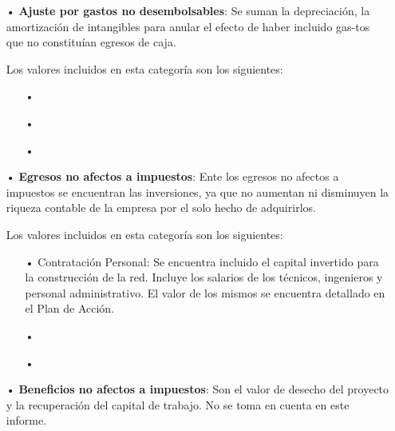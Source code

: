 \begin{enumerate}
\item[•]\textbf{Ajuste por gastos no desembolsables}:
Se suman la depreciación, la amortización 
de intangibles para anular el efecto de haber incluido gas-tos que no constituían egresos de caja.

Los valores incluidos en esta categoría son los siguientes:
\begin{enumerate}
\item[•]
\item[•]
\item[•]
\end{enumerate}


\item[•]\textbf{Egresos no afectos a impuestos}:
Ente los egresos no afectos a impuestos se encuentran las inversiones, ya que no aumentan ni disminuyen la riqueza contable de la empresa por el solo hecho de adquirirlos.

Los valores incluidos en esta categoría son los siguientes:
\begin{enumerate}
\item[•]Contratación Personal: Se encuentra incluido el capital invertido para la construcción de la red. Incluye los salarios de los técnicos, ingenieros
y personal administrativo. El valor de los mismos se encuentra detallado en el Plan de Acción.



\item[•] 
\item[•]
\end{enumerate}


\item[•]\textbf{Beneficios no afectos a impuestos}:
Son el valor de desecho del proyecto y la recuperación del capital de trabajo. No se toma en cuenta en este informe.



\end{enumerate}